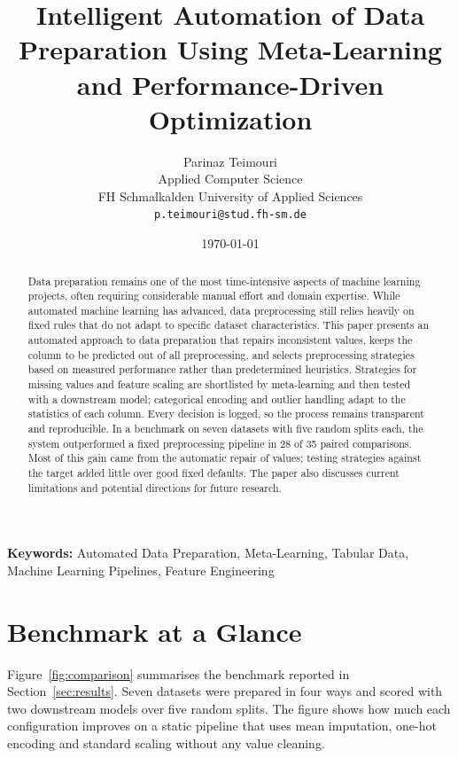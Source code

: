 \documentclass[11pt,a4paper]{article}
\title{\textbf{Intelligent Automation of Data Preparation Using Meta-Learning and Performance-Driven Optimization}}
\author{
    Parinaz Teimouri \\
    Applied Computer Science \\
    FH Schmalkalden University of Applied Sciences \\
    \texttt{p.teimouri@stud.fh-sm.de}
}
\date{\today}
\begin{document}
\maketitle

\begin{abstract}
Data preparation remains one of the most time-intensive aspects of machine learning projects, often requiring considerable manual effort and domain expertise. While automated machine learning has advanced, data preprocessing still relies heavily on fixed rules that do not adapt to specific dataset characteristics. This paper presents an automated approach to data preparation that repairs inconsistent values, keeps the column to be predicted out of all preprocessing, and selects preprocessing strategies based on measured performance rather than predetermined heuristics. Strategies for missing values and feature scaling are shortlisted by meta-learning and then tested with a downstream model; categorical encoding and outlier handling adapt to the statistics of each column. Every decision is logged, so the process remains transparent and reproducible. In a benchmark on seven datasets with five random splits each, the system outperformed a fixed preprocessing pipeline in 28 of 35 paired comparisons. Most of this gain came from the automatic repair of values; testing strategies against the target added little over good fixed defaults. The paper also discusses current limitations and potential directions for future research.
\end{abstract}

\noindent\textbf{Keywords:} Automated Data Preparation, Meta-Learning, Tabular Data, Machine Learning Pipelines, Feature Engineering


\section*{Benchmark at a Glance}

Figure~\ref{fig:comparison} summarises the benchmark reported in Section~\ref{sec:results}. Seven datasets were prepared in four ways and scored with two downstream models over five random splits. The figure shows how much each configuration improves on a static pipeline that uses mean imputation, one-hot encoding and standard scaling without any value cleaning.
\end{document}
